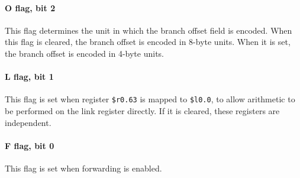 \paragraph*{O flag, bit 2}
This flag determines the unit in which the branch offset field is encoded. When
this flag is cleared, the branch offset is encoded in 8-byte units. When it is
set, the branch offset is encoded in 4-byte units.
\paragraph*{L flag, bit 1}
This flag is set when register \texttt{\$r0.63} is mapped to \texttt{\$l0.0}, to
allow arithmetic to be performed on the link register directly. If it is
cleared, these registers are independent.
\paragraph*{F flag, bit 0}
This flag is set when forwarding is enabled.
